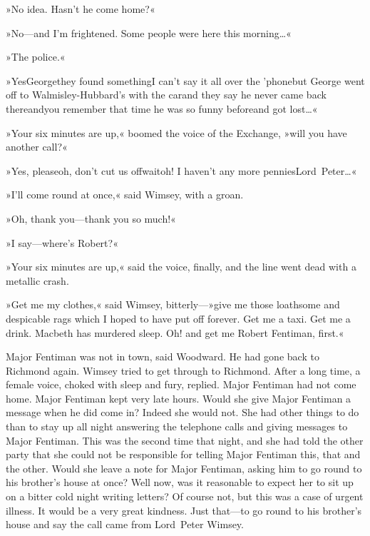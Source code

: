 »No idea. Hasn't he come home?«

»No—and I'm frightened. Some people were here this morning\dots«

»The police.«

»Yes\textellipsis  George\textellipsis  they found something\textellipsis  I can't say it all over the 'phone\textellipsis  but George went off to Walmisley-Hubbard's with the car\textellipsis  and they say he never came back there\textellipsis  and\textellipsis  you remember that time he was so funny before\textellipsis  and got lost\dots«

»Your six minutes are up,« boomed the voice of the Exchange, »will you have another call?«

»Yes, please\textellipsis  oh, don't cut us off\textellipsis  wait\textellipsis  oh! I haven't any more pennies\textellipsis  Lord~Peter\dots«

»I'll come round at once,« said Wimsey, with a groan.

»Oh, thank you—thank you so much!«

»I say—where's Robert?«

»Your six minutes are up,« said the voice, finally, and the line went dead with a metallic crash.

»Get me my clothes,« said Wimsey, bitterly—»give me those loathsome and despicable rags which I hoped to have put off forever. Get me a taxi. Get me a drink. Macbeth has murdered sleep. Oh! and get me Robert Fentiman, first.«

Major Fentiman was not in town, said Woodward. He had gone back to Richmond again. Wimsey tried to get through to Richmond. After a long time, a female voice, choked with sleep and fury, replied. Major Fentiman had not come home. Major Fentiman kept very late hours. Would she give Major Fentiman a message when he did come in? Indeed she would not. She had other things to do than to stay up all night answering the telephone calls and giving messages to Major Fentiman. This was the second time that night, and she had told the other party that she could not be responsible for telling Major Fentiman this, that and the other. Would she leave a note for Major Fentiman, asking him to go round to his brother's house at once? Well now, was it reasonable to expect her to sit up on a bitter cold night writing letters? Of course not, but this was a case of urgent illness. It would be a very great kindness. Just that—to go round to his brother's house and say the call came from Lord~Peter Wimsey.

